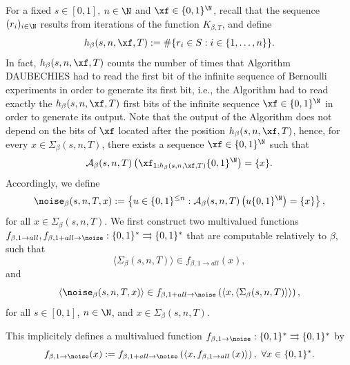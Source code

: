 For a fixed $s \in [0,1]$, $n \in \N$ and $\xf \in \{0,1\}^\N$, recall that the sequence $(r_i)_{i \in \N}$ results from iterations of the function $K_{\beta,T}$, and define
\begin{equation}
    h_\beta(s,n,\xf,T) := \# \{r_i \in S : i \in \{1,\ldots,n  \} \}.
\end{equation}
In fact, $h_\beta(s,n,\xf,T)$ counts the number of times that Algorithm DAUBECHIES had to read the first bit of the infinite sequence of Bernoulli experiments in order to generate its first bit, i.e., the Algorithm had to read exactly the $h_\beta(s,n,\xf,T)$ first bits of the infinite sequence $\xf \in \{0,1\}^\N$ in order to generate its output. Note that the output of the Algorithm does not depend on the bits of $\xf$ located after the position $h_\beta(s,n,\xf,T)$, hence, for every $x \in \Sigma_\beta(s,n,T)$, there exists a sequence $\xf \in \{0,1\}^\N$ such that 
\begin{equation}
    \mathcal A_\beta(s,n,T)\left(\xf_{1:h_\beta(s,n,\xf,T)} \{0,1\}^\N\right) = \{x\}.
\end{equation}
Accordingly, we define 
\begin{equation}
    \noise_\beta(s,n,T,x) := \left\{u \in \{0,1\}^{\leq n} : \mathcal A_\beta(s,n,T)\left(u \{0,1\}^\N\right) = \{x\}\right\},
\end{equation}
for all $x \in \Sigma_\beta(s,n,T)$. We first construct two multivalued functions $f_{\beta, 1 \to all}, f_{\beta, 1+all \to \noise} : \{0,1\}^\ast \rightrightarrows \{0,1\}^\ast$ that are computable relatively to $\beta$, such that
\begin{equation}
    \langle \Sigma_\beta(s,n,T) \rangle \in f_{\beta, 1 \to all}\left(x\right), 
\end{equation}
and
\begin{equation}
    \langle \noise_\beta(s,n,T,x) \rangle \in f_{\beta , 1+all \to \noise}\left(\langle x,\langle \Sigma_\beta(s,n,T) \rangle \rangle \right),
\end{equation}
for all $s \in [0,1]$, $n \in \N$, and $x \in \Sigma_\beta(s,n,T)$. 



This implicitely defines a multivalued function $f_{\beta, 1 \to \noise} : \{0,1\}^\ast \rightrightarrows \{0,1\}^\ast$ by 
\begin{equation}
    f_{\beta, 1 \to \noise}(x) := f_{\beta , 1+all \to \noise}\left(\langle x, f_{\beta, 1 \to all}\left(x\right) \rangle \right), \ \forall x \in \{0,1\}^\ast.
\end{equation}





